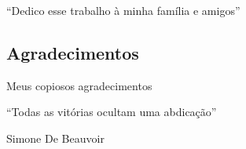 \documentclass{ufpatcc}
\begin{document}
\ufpaPaginaDeRosto


\ufpaPagRostodo 

\ufpaPaginaDeAprovacao


\begin{ufpaOferecimento}
    “Dedico esse trabalho à minha família e amigos”

\end{ufpaOferecimento}


\begin{ufpaAgradecimentos}
	\chapter*{Agradecimentos}
    Meus copiosos agradecimentos 

\end{ufpaAgradecimentos}


\begin{ufpaEpigrafe}
    ``Todas as vitórias ocultam uma abdicação''
    \begin{flushright}Simone De Beauvoir\end{flushright}
\end{ufpaEpigrafe}



\tableofcontents
\clearpage

%
%
%
%
%


\end{document}
